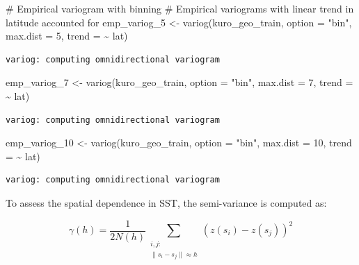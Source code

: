\documentclass[
  11pt,
]{article}
\newenvironment{Shaded}{\begin{snugshade}}{\end{snugshade}}
\newcommand{\AttributeTok}[1]{\textcolor[rgb]{0.40,0.45,0.13}{#1}}
\newcommand{\CommentTok}[1]{\textcolor[rgb]{0.37,0.37,0.37}{#1}}
\newcommand{\DecValTok}[1]{\textcolor[rgb]{0.68,0.00,0.00}{#1}}
\newcommand{\FunctionTok}[1]{\textcolor[rgb]{0.28,0.35,0.67}{#1}}
\newcommand{\NormalTok}[1]{\textcolor[rgb]{0.00,0.23,0.31}{#1}}
\newcommand{\OtherTok}[1]{\textcolor[rgb]{0.00,0.23,0.31}{#1}}
\newcommand{\SpecialCharTok}[1]{\textcolor[rgb]{0.37,0.37,0.37}{#1}}
\newcommand{\StringTok}[1]{\textcolor[rgb]{0.13,0.47,0.30}{#1}}
\begin{document}
\begin{Shaded}
\begin{Highlighting}[]
\CommentTok{\# Empirical variogram with binning}
\CommentTok{\# Empirical variograms with linear trend in latitude accounted for}
\NormalTok{emp\_variog\_5 }\OtherTok{\textless{}{-}} \FunctionTok{variog}\NormalTok{(kuro\_geo\_train, }\AttributeTok{option =} \StringTok{"bin"}\NormalTok{, }\AttributeTok{max.dist =} \DecValTok{5}\NormalTok{, }\AttributeTok{trend =} \SpecialCharTok{\textasciitilde{}}\NormalTok{ lat)}
\end{Highlighting}
\end{Shaded}

\begin{verbatim}
variog: computing omnidirectional variogram
\end{verbatim}

\begin{Shaded}
\begin{Highlighting}[]
\NormalTok{emp\_variog\_7 }\OtherTok{\textless{}{-}} \FunctionTok{variog}\NormalTok{(kuro\_geo\_train, }\AttributeTok{option =} \StringTok{"bin"}\NormalTok{, }\AttributeTok{max.dist =} \DecValTok{7}\NormalTok{, }\AttributeTok{trend =} \SpecialCharTok{\textasciitilde{}}\NormalTok{ lat)}
\end{Highlighting}
\end{Shaded}

\begin{verbatim}
variog: computing omnidirectional variogram
\end{verbatim}

\begin{Shaded}
\begin{Highlighting}[]
\NormalTok{emp\_variog\_10 }\OtherTok{\textless{}{-}} \FunctionTok{variog}\NormalTok{(kuro\_geo\_train, }\AttributeTok{option =} \StringTok{"bin"}\NormalTok{, }\AttributeTok{max.dist =} \DecValTok{10}\NormalTok{, }\AttributeTok{trend =} \SpecialCharTok{\textasciitilde{}}\NormalTok{ lat)}
\end{Highlighting}
\end{Shaded}

\begin{verbatim}
variog: computing omnidirectional variogram
\end{verbatim}

To assess the spatial dependence in SST, the semi-variance is computed
as:

\[
\gamma(h) = \frac{1}{2N(h)} \sum_{\substack{i,j: \\ \|s_i - s_j\| \approx h}} \left( z(s_i) - z(s_j) \right)^2
\]
\end{document}
